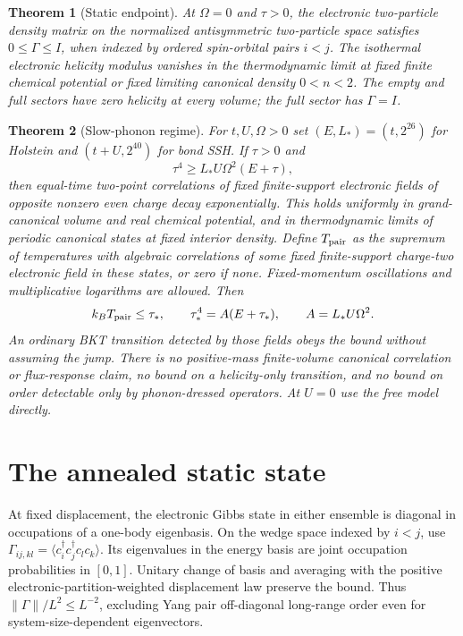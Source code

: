 \documentclass[11pt]{article}
\newtheorem{theorem}{Theorem}
\begin{document}
\begin{theorem}[Static endpoint]
At $\Omega=0$ and $\tau>0$, the electronic two-particle density matrix on the normalized antisymmetric two-particle space satisfies $0\le\Gamma\le I$, when indexed by ordered spin-orbital pairs $i<j$. The isothermal electronic helicity modulus vanishes in the thermodynamic limit at fixed finite chemical potential or fixed limiting canonical density $0<n<2$. The empty and full sectors have zero helicity at every volume; the full sector has $\Gamma=I$.
\end{theorem}
\begin{theorem}[Slow-phonon regime]\label{thm:slow}
For $t,U,\Omega>0$ set $(E,L_*)=(t,2^{26})$ for Holstein and $(t+U,2^{40})$ for bond SSH. If $\tau>0$ and
\begin{equation}\label{eq:criterion}
\tau^4\ge L_* U\Omega^2(E+\tau),
\end{equation}
then equal-time two-point correlations of fixed finite-support electronic fields of opposite nonzero even charge decay exponentially. This holds uniformly in grand-canonical volume and real chemical potential, and in thermodynamic limits of periodic canonical states at fixed interior density. Define $T_{\rm pair}$ as the supremum of temperatures with algebraic correlations of some fixed finite-support charge-two electronic field in these states, or zero if none. Fixed-momentum oscillations and multiplicative logarithms are allowed. Then
\begin{equation}\label{eq:bound}
 k_BT_{\rm pair}\le \tau_*,\qquad
 \tau_*^4=A(E+\tau_*),\qquad A=L_*U\Omega^2.
\end{equation}
An ordinary BKT transition detected by those fields obeys the bound without assuming the jump. There is no positive-mass finite-volume canonical correlation or flux-response claim, no bound on a helicity-only transition, and no bound on order detectable only by phonon-dressed operators. At $U=0$ use the free model directly.
\end{theorem}

\section{The annealed static state}
At fixed displacement, the electronic Gibbs state in either ensemble is diagonal in occupations of a one-body eigenbasis. On the wedge space indexed by $i<j$, use $\Gamma_{ij,kl}=\langle c_i^\dagger c_j^\dagger c_l c_k\rangle$. Its eigenvalues in the energy basis are joint occupation probabilities in $[0,1]$. Unitary change of basis and averaging with the positive electronic-partition-weighted displacement law preserve the bound. Thus $\|\Gamma\|/L^2\le L^{-2}$, excluding Yang pair off-diagonal long-range order even for system-size-dependent eigenvectors.
\end{document}
